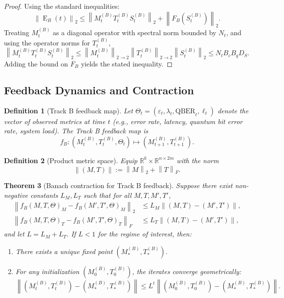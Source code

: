 \documentclass[11pt]{article}
\newtheorem{definition}{Definition}[section]
\newtheorem{theorem}[definition]{Theorem}
\newcommand{\R}{\mathbb{R}}
\DeclareMathOperator{\EncOp}{E}
\newcommand{\norm}[1]{\left\lVert #1 \right\rVert}
\begin{document}
\begin{proof}
Using the standard inequalities:
\[
  \norm{\EncOp_B(t)}_2 \le \norm{M_t^{(B)} T_t^{(B)} S_t^{(B)}}_2 + \norm{F_B(S_t^{(B)})}_2.
\]
Treating \(M_t^{(B)}\) as a diagonal operator with spectral norm bounded by \(N_t\), and using the operator norms for \(T_t^{(B)}\),
\[
  \norm{M_t^{(B)} T_t^{(B)} S_t^{(B)}}_2 \le \norm{M_t^{(B)}}_{2\to 2} \norm{T_t^{(B)}}_{2\to 2} \norm{S_t^{(B)}}_2 \le N_t B_c B_q D_S.
\]
Adding the bound on \(F_B\) yields the stated inequality.
\end{proof}

\subsection{Feedback Dynamics and Contraction}

\begin{definition}[Track B feedback map]
Let \(\Theta_t = (\varepsilon_t, \lambda_t, \mathrm{QBER}_t, \ell_t)\) denote the vector of observed metrics at time \(t\) (e.g., error rate, latency, quantum bit error rate, system load).
The Track B feedback map is
\[
  f_B : (M_t^{(B)}, T_t^{(B)}, \Theta_t) \mapsto (M_{t+1}^{(B)}, T_{t+1}^{(B)}).
\]
\end{definition}

\begin{definition}[Product metric space]
Equip \(\R^k \times \R^{n\times 2m}\) with the norm
\[
  \norm{(M,T)} := \norm{M}_2 + \norm{T}_F.
\]
\end{definition}

\begin{theorem}[Banach contraction for Track B feedback]
Suppose there exist non-negative constants \(L_M, L_T\) such that for all \(M,T,M',T'\),
\begin{align*}
  \norm{f_B(M,T,\Theta)_M - f_B(M',T',\Theta)_M}_2 &\le L_M \norm{(M,T)-(M',T')}, \\
  \norm{f_B(M,T,\Theta)_T - f_B(M',T',\Theta)_T}_F &\le L_T \norm{(M,T)-(M',T')},
\end{align*}
and let \(L = L_M + L_T\).
If \(L < 1\) for the regime of interest, then:
\begin{enumerate}[leftmargin=1.5em]
  \item There exists a unique fixed point \((M_\ast^{(B)}, T_\ast^{(B)})\).
  \item For any initialization \((M_0^{(B)}, T_0^{(B)})\), the iterates converge geometrically:
  \[
    \norm{(M_t^{(B)}, T_t^{(B)}) - (M_\ast^{(B)}, T_\ast^{(B)})} \le L^t \norm{(M_0^{(B)}, T_0^{(B)}) - (M_\ast^{(B)}, T_\ast^{(B)})}.
  \]
\end{enumerate}
\end{theorem}
\end{document}
